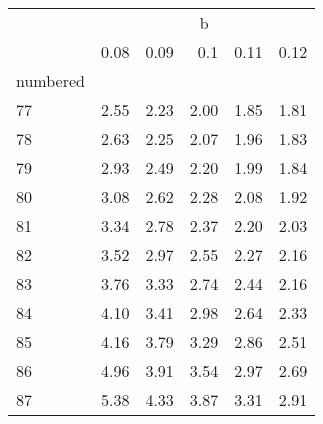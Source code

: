 \captionsetup[table]{labelformat=empty,skip=1pt}
\begin{longtable}{lrrrrr}
\toprule
& \multicolumn{5}{c}{b} \\ 
 \cmidrule(lr){2-6}
 & 0.08 & 0.09 & 0.1 & 0.11 & 0.12 \\ 
\midrule
\multicolumn{1}{l}{numbered} \\ 
\midrule
77 & 2.55 & 2.23 & 2.00 & 1.85 & 1.81 \\ 
78 & 2.63 & 2.25 & 2.07 & 1.96 & 1.83 \\ 
79 & 2.93 & 2.49 & 2.20 & 1.99 & 1.84 \\ 
80 & 3.08 & 2.62 & 2.28 & 2.08 & 1.92 \\ 
81 & 3.34 & 2.78 & 2.37 & 2.20 & 2.03 \\ 
82 & 3.52 & 2.97 & 2.55 & 2.27 & 2.16 \\ 
83 & 3.76 & 3.33 & 2.74 & 2.44 & 2.16 \\ 
84 & 4.10 & 3.41 & 2.98 & 2.64 & 2.33 \\ 
85 & 4.16 & 3.79 & 3.29 & 2.86 & 2.51 \\ 
86 & 4.96 & 3.91 & 3.54 & 2.97 & 2.69 \\ 
87 & 5.38 & 4.33 & 3.87 & 3.31 & 2.91 \\ 
\bottomrule
\end{longtable}

